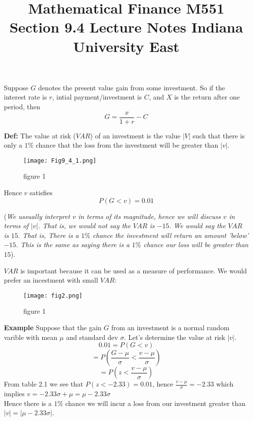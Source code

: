 \documentclass[12 pt, a4paper]{article}
\begin{document}
\title{Mathematical Finance M551 \linebreak Section 9.4 Lecture Notes \linebreak Indiana University East}
\author{}
\date{}
\maketitle
Suppose $G$ denotes the present value gain from some investment. So if the interest rate is $r$, intial payment/investment is $C$, and $X$ is the return after one period, then
$$G=\frac{x}{1+r}-C$$

\textbf{Def:} The value at risk ($VAR$) of an investment is the value $|V|$ such that there is only a $1\%$ chance that the loss from the investment will be greater than $|v|$.
\begin{figure}
	\texttt{[image: Fig9\_4\_1.png]}
\caption{figure 1}
	\label{fig: 1}
\end{figure}
Hence $v$ satisfies
$$P(G<v)=0.01$$

(\textit{We ussually interpret $v$ in terms of its magnitude, hence we will discuss $v$ in terms of $|v|$. That is, we would not say the $VAR$ is $-15$. We would say the $VAR$ is $15$. That is, There is a $1\%$ chance the investment will return an amount 'below' $-15$. This is the same as saying there is a $1\%$ chance our loss will be greater than $15$}).

$VAR$ is important because it can be used as a measure of performance. We would prefer an incestment with small $VAR$:\\

\begin{figure}
\texttt{[image: fig2.png]}
\caption{figure 1}
	\label{fig: 1}
\end{figure}
\textbf{Example} Suppose that the gain $G$ from an investment is a normal random varible with mean $\mu$ and standard dev $\sigma$. Let's determine the value at risk $|v|$. \\
$$0.01=P(G<v)$$
$$=P(\frac{G-\mu}{\sigma}<\frac{v-\mu}{\sigma})$$
$$=P(z<\frac{v-\mu}{\sigma})$$
From table 2.1 we see that $P(z<-2.33)=0.01$, hence
$\frac{v-\mu}{\sigma}=-2.33$ which implies
$v=-2.33\sigma+\mu=\mu-2.33\sigma$\\

Hence there is a $1\%$ chance we will incur a loss from our investment
greater than $|v|=|\mu-2.33\sigma|$.
\end{document}
